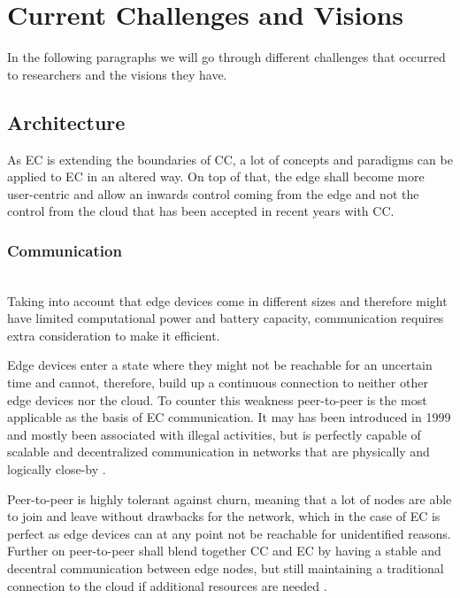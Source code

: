 \section{Current Challenges and Visions}\label{sec:main}

In the following paragraphs we will go through different challenges that occurred to researchers and the visions they have.

\subsection{Architecture}
As EC is extending the boundaries of CC, a lot of concepts and paradigms can be applied to EC in an altered way. On top of that, the edge shall become more user-centric and allow an inwards control coming from the edge and not the control from the cloud that has been accepted in recent years with CC.

\subsubsection{Communication}\hspace*{\fill} \\
Taking into account that edge devices come in different sizes and therefore might have limited computational power and battery capacity, communication requires extra consideration to make it efficient.

Edge devices enter a state where they might not be reachable for an uncertain time and cannot, therefore, build up a continuous connection to neither other edge devices nor the cloud.
To counter this weakness peer-to-peer is the most applicable as the basis of EC communication. It may has been introduced in 1999 and mostly been associated with illegal activities, but is perfectly capable of scalable and decentralized communication in networks that are physically and logically close-by \cite{GarciaLopez:2015:ECV:2831347.2831354}.

Peer-to-peer is highly tolerant against churn, meaning that a lot of nodes are able to join and leave without drawbacks for the network, which in the case of EC is perfect as edge devices can at any point not be reachable for unidentified reasons. Further on peer-to-peer shall blend together CC and EC by having a stable and decentral communication between edge nodes, but still maintaining a traditional connection to the cloud if additional resources are needed \cite{GarciaLopez:2015:ECV:2831347.2831354}.

